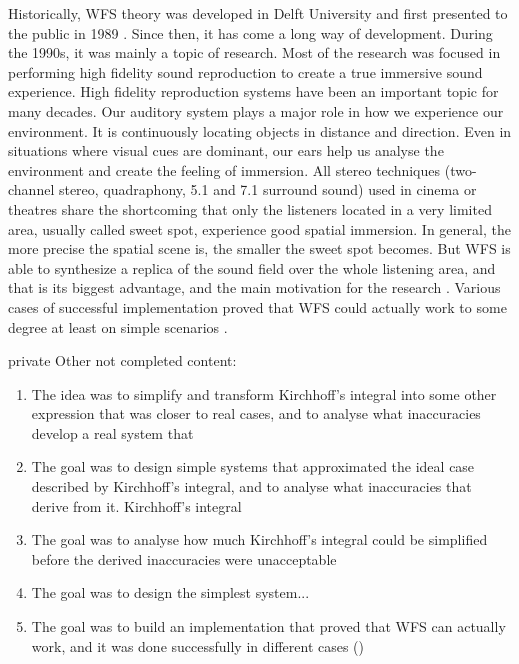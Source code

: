 Historically, WFS theory was developed in Delft University and first presented to the public in 1989 \cite{berkhout1989acoustic}. Since then, it has come a long way of development. During the 1990s, it was mainly a topic of research. Most of the research was focused in performing high fidelity sound reproduction to create a true immersive sound experience. 
High fidelity reproduction systems have been an important topic for many decades. Our auditory system plays a major role in how we experience our environment. It is continuously locating objects in distance and direction. Even in situations where visual cues are dominant, our ears help us analyse the environment and create the feeling of immersion. All stereo techniques (two-channel stereo, quadraphony, 5.1 and 7.1 surround sound) used in cinema or theatres share the shortcoming that only the listeners located in a very limited area, usually called sweet spot, experience good spatial immersion. In general, the more precise the spatial scene is, the smaller the sweet spot becomes. But WFS is able to synthesize a replica of the sound field over the whole listening area, and that is its biggest advantage, and the main motivation for the research \cite{Brandenburg2009}.
Various cases of successful implementation proved that WFS could actually work to some degree at least on simple scenarios \cite{Start1997,Verheijen,Vogel}.

\begin{shownto}{private}
	Other not completed content:
	\begin{enumerate}
		\item The idea was to simplify and transform Kirchhoff's integral into some other expression that was closer to real cases, and to analyse what inaccuracies  develop a real system that
		\item The goal was to design simple systems that approximated the ideal case described by Kirchhoff's integral, and to analyse what inaccuracies that derive from it. Kirchhoff's integral 
		\item The goal was to analyse how much Kirchhoff's integral could be simplified before the derived inaccuracies were unacceptable
		\item The goal was to design the simplest system...
		\item The goal was to build an implementation that proved that WFS can actually work, and it was done successfully in different cases (\cite{Start1997}\cite{Verheijen}\cite{Vogel})
	\end{enumerate}
\end{shownto}

